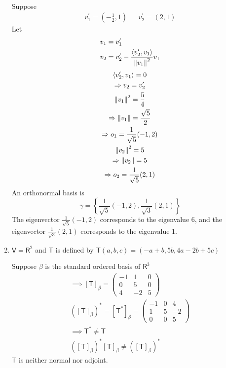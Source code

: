 \begin{enumerate}
\begin{itemize}
\begin{gather}
\end{gather}
\end{itemize}
Suppose
\begin{align}
v_1^\prime = (-\frac{1}{2},1) & & v_2^\prime = (2,1)
\end{align}
Let
\begin{align}
v_1 &= v_1^\prime\\
v_2 &= v_2^\prime - \frac{\langle v_2^\prime, v_1\rangle}{\left\lVert v_1\right\rVert^2}v_1
\end{align}
\begin{gather}
\langle v_2^\prime,v_1\rangle = 0\\
\Rightarrow v_2 = v_2^\prime\\
\left\lVert v_1\right\rVert^2 = \frac{5}{4}\\
\Rightarrow \left\lVert v_1\right\rVert = \frac{\sqrt{5}}{2}\\
\Rightarrow o_1 = \frac{1}{\sqrt{5}}(-1,2)\\
\left\lVert v_2\right\rVert^2 = 5 \\
\Rightarrow \left\lVert v_2\right\rVert =5\\
\Rightarrow o_2 = \frac{1}{\sqrt{5}}(2,1)
\end{gather}
An orthonormal basis is
\begin{equation}
\gamma = \left\{\frac{1}{\sqrt{5}}(-1,2),\frac{1}{\sqrt{3}}(2,1)\right\}
\end{equation}
The eigenvector $\frac{1}{\sqrt{5}}(-1,2)$ corresponds to the
eigenvalue 6, and the eigenvector $\frac{1}{\sqrt{3}}(2,1)$
corresponds to the eigenvalue 1.

\item $\mathsf{V} = \mathsf{R}^2$ and $\mathsf{T}$ is defined by
  $\mathsf{T}(a,b,c) = (-a+b,5b,4a-2b+5c)$

Suppose $\beta$ is the standard ordered basis of $\mathsf{R}^3$
\begin{gather}
\implies [\mathsf{T}]_\beta = \begin{pmatrix}
-1 & 1 & 0\\
0 & 5 & 0\\
4 & -2 & 5
\end{pmatrix}\\
([\mathsf{T}]_\beta)^* = [\mathsf{T}^*]_\beta = \begin{pmatrix}
-1 & 0 & 4\\
1 & 5 & -2\\
0 & 0 & 5
\end{pmatrix}\\
\implies \mathsf{T}^* \neq \mathsf{T}\\
([\mathsf{T}]_\beta)^*[\mathsf{T}]_\beta \neq ([\mathsf{T}]_\beta)^*
\end{gather}
$\mathsf{T}$ is neither normal nor adjoint.
\end{enumerate}

